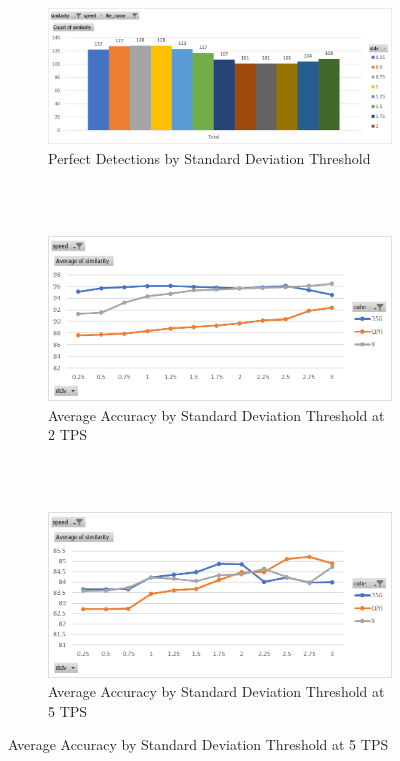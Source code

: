\begin{figure}
    \caption{Influence of Standard Deviation Threshold on Accuracy}
    \label{fig:influence-stdv-threshold}
    \begin{subfigure}{\textwidth}
        \centering
        \caption{Perfect Detections by Standard Deviation Threshold}
        \label{fig:influence-stdv-threshold-perfect}
        \includegraphics[width=\linewidth]{Figures/7 Evaluation/perfect_detections_by_stdv.png}
    \end{subfigure}\\\\
    \begin{subfigure}{\textwidth}
        \centering
        \caption{Average Accuracy by Standard Deviation Threshold at 2 TPS}
        \label{fig:influence-stdv-threshold-average-2tps}
        \includegraphics[width=\linewidth]{Figures/7 Evaluation/similarity_by_cube_2tps.png}
    \end{subfigure}\\\\
    \begin{subfigure}{\textwidth}
        \centering
        \caption{Average Accuracy by Standard Deviation Threshold at 5 TPS}
        \label{fig:influence-stdv-threshold-average-5tps}
        \includegraphics[width=\linewidth]{Figures/7 Evaluation/similarity_by_cube_5tps.png}

\end{subfigure}
\end{figure}
